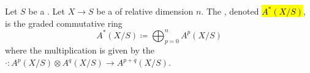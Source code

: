 \begin{definition} \label{definition:relative_chow_ring_of_a_smooth_projective_scheme_over_a_noetherian_base}
Let $S$ be a . Let $X \to S$ be a   of relative dimension $n$. 
The , denoted \hl{$A^*(X/S)$}, is the graded commutative ring 
\[ A^*(X/S) \coloneqq \bigoplus_{p=0}^n A^p(X/S) \]
where the multiplication is given by the  $\cdot: A^p(X/S) \otimes A^q(X/S) \to A^{p+q}(X/S)$. 
\end{definition}